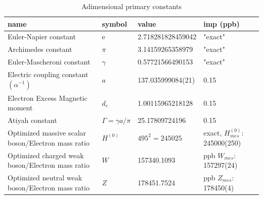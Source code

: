 \documentclass[a4paper,9pt]{article}
\newcounter{col}
\begin{document}
\begin{table}
\caption[Table \ref{tab:2:table2}: Adimensional primary constants.]{Adimensional primary constants}
\label{tab:2:table2}
  \hskip-2.0cm\begin{tabular}{llll}
    \toprule
    \cmidrule(r){1-4}
    name & symbol    & value & imp (ppb) \\
    \midrule
    
    Euler-Napier constant  & e    & 2.718281828459042 & "exact" \\    
    Archimedes constant & $\pi$    & 3.14159265358979 & "exact" \\    
    Euler-Mascheroni constant & $\gamma$    & 0.57721566490153 & "exact" \\    
     
    Electric coupling constant $(\alpha^{-1})$  & $a$    & 137.035999084(21) & 0.15 \\
    Electron Excess Magnetic moment  & $d_e$    & 1.00115965218128 & 0.15 \\
    Atiyah constant & $\Gamma= \gamma a/\pi$    & 25.17809724196  & 0.15 \\ 
    Optimized massive scalar boson/Electron mass ratio  & $H^{(0)}$ & $ 495^2 = 245025$  & exact, $H^{(0)}_{mes}$: 245000(250)  \\
    
    Optimized  charged weak  boson/Electron mass ratio  & $W$ & 157340.1093  & ppb\cite{Sanchez2} $W_{mes}$: 157297(24)  \\     
    
    Optimized  neutral weak boson/Electron mass ratio  & $Z$ & 178451.7524  & ppb\cite{Sanchez2} $Z_{mes}$: 178450(4)\\     
   

\end{tabular}
\end{table}
\end{document}
